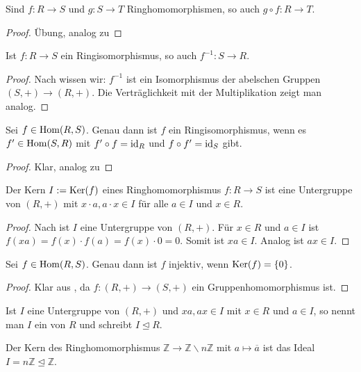 \begin{proposition}
	Sind $f:R\to S$ und $g:S\to T$ Ringhomomorphismen, so auch $g\circ f:R\to T$.
\end{proposition}
\begin{proof}
	Übung, analog zu 
\end{proof}

\begin{lemma}
	Ist $f:R\to S$ ein Ringisomorphismus, so auch $f^{-1}: S\to R$.
\end{lemma}
\begin{proof}
	Nach  wissen wir: $f^{-1}$ ist ein Isomorphismus der abelschen Gruppen $(S,+)\to (R,+)$. Die Verträglichkeit 
	mit der Multiplikation zeigt man analog.
\end{proof}

\begin{proposition}
	Sei $f\in \operatorname{Hom}(R,S)$. Genau dann ist $f$ ein Ringisomorphismus, wenn es $f'\in \operatorname{Hom}(S,R)$ mit $f'\circ 
	f=\operatorname{id}_R$ und $f\circ f'=\operatorname{id}_S$ gibt.
\end{proposition}
\begin{proof}
	Klar, analog zu 
\end{proof}

\begin{lemma}
	Der Kern $I:=\operatorname{Ker}(f)$ eines Ringhomomorphismus $f:R\to S$ ist eine Untergruppe von $(R,+)$ mit 
	$x\cdot a, a\cdot x \in I$ für alle $a\in I$ und $x\in R$.
\end{lemma}
\begin{proof}
	Nach  ist $I$ eine Untergruppe von $(R,+)$. Für $x\in R$ und $a \in I$ ist $f(xa)=f(x)\cdot 
	f(a)=f(x)\cdot 0=0$. Somit ist $xa\in I$. Analog ist $ax\in I$.
\end{proof}

\begin{proposition}
	Sei $f\in \operatorname{Hom}(R,S)$. Genau dann ist $f$ injektiv, wenn $\operatorname{Ker}(f)=\{0\}$.
\end{proposition}
\begin{proof}
	Klar aus , da $f:(R,+)\to (S,+)$ ein Gruppenhomomorphismus ist.
\end{proof}

\begin{definition}[Ideal]
	Ist $I$ eine Untergruppe von $(R,+)$ und $xa,ax\in I$ mit $x\in R$ und $a\in I$, so nennt 
	man $I$ ein  von $R$ und schreibt $I\unlhd R$.
\end{definition}

\begin{example}
	Der Kern des Ringhomomorphismus $\mathbb Z\to \mathbb Z\backslash n\mathbb Z$ mit $a\mapsto 
	\overline a$ ist das Ideal $I=n\mathbb Z\unlhd \mathbb Z$.
\end{example}